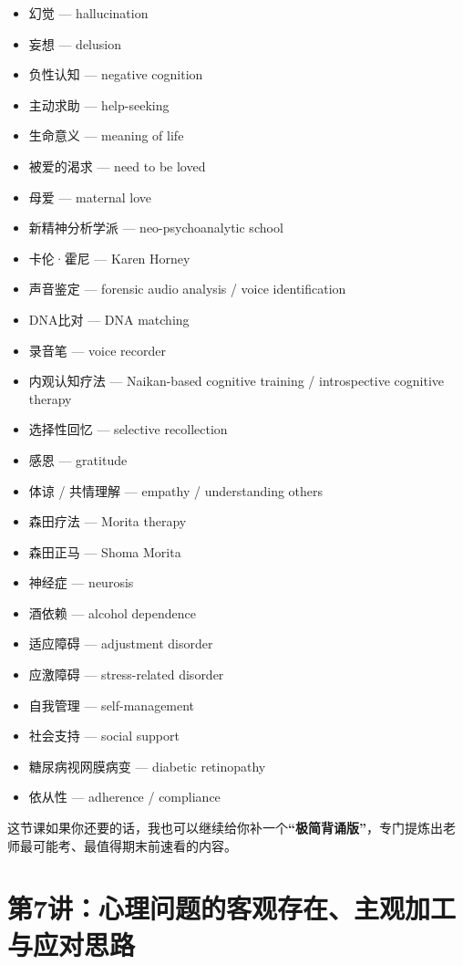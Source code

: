 \documentclass[
  chinese,
  9pt,
  a4paper,
]{ctexart}
\begin{document}
\begin{itemize}
  抑郁 --- depression
\item
  幻觉 --- hallucination
\item
  妄想 --- delusion
\item
  负性认知 --- negative cognition
\item
  主动求助 --- help-seeking
\item
  生命意义 --- meaning of life
\item
  被爱的渴求 --- need to be loved
\item
  母爱 --- maternal love
\item
  新精神分析学派 --- neo-psychoanalytic school
\item
  卡伦·霍尼 --- Karen Horney
\item
  声音鉴定 --- forensic audio analysis / voice identification
\item
  DNA比对 --- DNA matching
\item
  录音笔 --- voice recorder
\item
  内观认知疗法 --- Naikan-based cognitive training / introspective
  cognitive therapy
\item
  选择性回忆 --- selective recollection
\item
  感恩 --- gratitude
\item
  体谅 / 共情理解 --- empathy / understanding others
\item
  森田疗法 --- Morita therapy
\item
  森田正马 --- Shoma Morita
\item
  神经症 --- neurosis
\item
  酒依赖 --- alcohol dependence
\item
  适应障碍 --- adjustment disorder
\item
  应激障碍 --- stress-related disorder
\item
  自我管理 --- self-management
\item
  社会支持 --- social support
\item
  糖尿病视网膜病变 --- diabetic retinopathy
\item
  依从性 --- adherence / compliance
\end{itemize}

这节课如果你还要的话，我也可以继续给你补一个\textbf{``极简背诵版''}，专门提炼出老师最可能考、最值得期末前速看的内容。

\clearpage

\section{第7讲：心理问题的客观存在、主观加工与应对思路}\label{ux7b2c7ux8bb2ux5fc3ux7406ux95eeux9898ux7684ux5ba2ux89c2ux5b58ux5728ux4e3bux89c2ux52a0ux5de5ux4e0eux5e94ux5bf9ux601dux8def}
\end{document}
